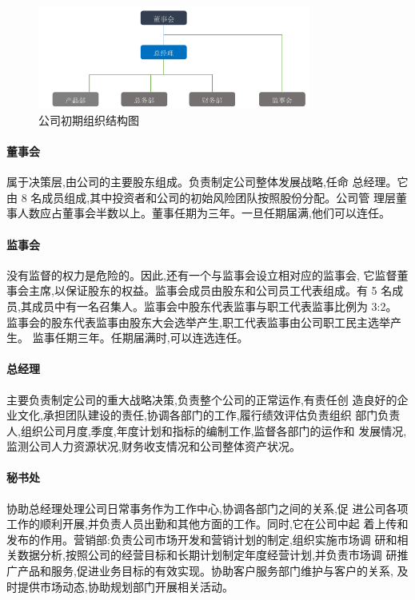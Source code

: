 \begin{figure}[htbp]
\centering
\label{figure:early-struct}
\includegraphics[width=0.8\textwidth]{../images/company/早期结构}
\caption{公司初期组织结构图}
\end{figure}

\paragraph{董事会}
属于决策层,由公司的主要股东组成。负责制定公司整体发展战略,任命
总经理。它由 8 名成员组成,其中投资者和公司的初始风险团队按照股份分配。公司管
理层董事人数应占董事会半数以上。董事任期为三年。一旦任期届满,他们可以连任。
\paragraph{ 监事会 }
没有监督的权力是危险的。因此,还有一个与监事会设立相对应的监事会,
它监督董事会主席,以保证股东的权益。监事会成员由股东和公司员工代表组成。有 5
名成员,其成员中有一名召集人。监事会中股东代表监事与职工代表监事比例为 3:2。
监事会的股东代表监事由股东大会选举产生,职工代表监事由公司职工民主选举产生。
监事任期三年。任期届满时,可以连选连任。
\paragraph{ 总经理 }
主要负责制定公司的重大战略决策,负责整个公司的正常运作,有责任创
造良好的企业文化,承担团队建设的责任,协调各部门的工作,履行绩效评估负责组织
部门负责人,组织公司月度,季度,年度计划和指标的编制工作,监督各部门的运作和
发展情况,监测公司人力资源状况,财务收支情况和公司整体资产状况。
\paragraph{秘书处}
协助总经理处理公司日常事务作为工作中心,协调各部门之间的关系,促
进公司各项工作的顺利开展,并负责人员出勤和其他方面的工作。同时,它在公司中起
着上传和发布的作用。营销部:负责公司市场开发和营销计划的制定,组织实施市场调
研和相关数据分析,按照公司的经营目标和长期计划制定年度经营计划,并负责市场调
研推广产品和服务,促进业务目标的有效实现。协助客户服务部门维护与客户的关系,
及时提供市场动态,协助规划部门开展相关活动。

